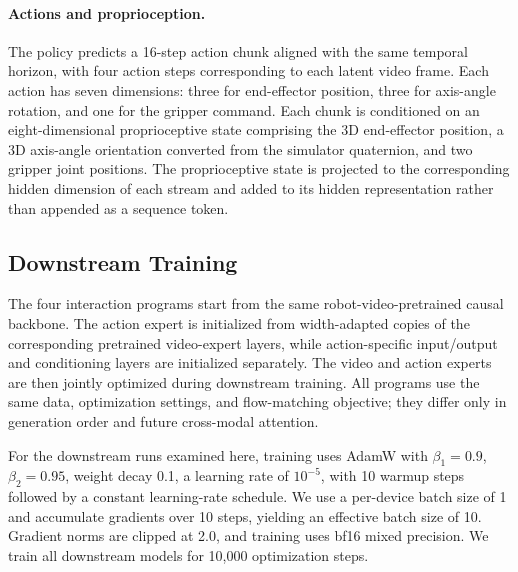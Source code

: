 \paragraph{Actions and proprioception.}
The policy predicts a 16-step action chunk aligned with the same temporal horizon, with four action steps corresponding to each latent video frame. Each action has seven dimensions: three for end-effector position, three for axis-angle rotation, and one for the gripper command. Each chunk is conditioned on an eight-dimensional proprioceptive state comprising the 3D end-effector position, a 3D axis-angle orientation converted from the simulator quaternion, and two gripper joint positions. The proprioceptive state is projected to the corresponding hidden dimension of each stream and added to its hidden representation rather than appended as a sequence token.

\subsection{Downstream Training}
\label{sec:supp-training}

The four interaction programs start from the same robot-video-pretrained causal backbone. The action expert is initialized from width-adapted copies of the corresponding pretrained video-expert layers, while action-specific input/output and conditioning layers are initialized separately. The video and action experts are then jointly optimized during downstream training. All programs use the same data, optimization settings, and flow-matching objective; they differ only in generation order and future cross-modal attention.

For the downstream runs examined here, training uses AdamW with
$\beta_1=0.9$, $\beta_2=0.95$, weight decay 0.1, a learning rate of
$10^{-5}$, with 10 warmup steps followed by a constant learning-rate schedule.
We use a per-device batch size of 1 and accumulate gradients over 10 steps, yielding an effective batch size of 10. Gradient norms
are clipped at 2.0, and training uses bf16 mixed precision.
We train all downstream models for 10,000 optimization steps. 


